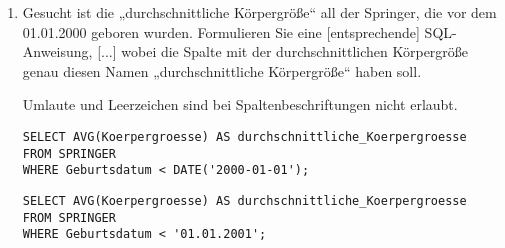 \documentclass{lehramt-informatik-aufgabe}
\begin{document}
\begin{enumerate}
\item Gesucht ist die „durchschnittliche Körpergröße“ all der Springer,
die vor dem 01.01.2000 geboren wurden. Formulieren Sie eine
[entsprechende] SQL-Anweisung, [...] wobei die Spalte mit der
durchschnittlichen Körpergröße genau diesen Namen „durchschnittliche
Körpergröße“ haben soll.

\begin{antwort}
Umlaute und Leerzeichen sind bei Spaltenbeschriftungen nicht erlaubt.

\begin{verbatim}
SELECT AVG(Koerpergroesse) AS durchschnittliche_Koerpergroesse
FROM SPRINGER
WHERE Geburtsdatum < DATE('2000-01-01');
\end{verbatim}
\end{antwort}

\begin{antwort}
\begin{verbatim}
SELECT AVG(Koerpergroesse) AS durchschnittliche_Koerpergroesse
FROM SPRINGER
WHERE Geburtsdatum < '01.01.2001';
\end{verbatim}
\end{antwort}

\end{enumerate}
\end{document}
